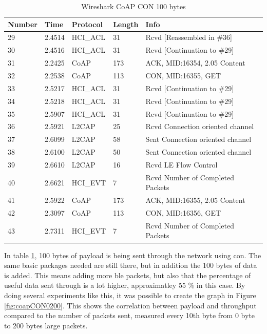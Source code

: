 \begin{table}[H]
\centering
\caption{Wireshark CoAP CON 100 bytes}
\label{coapCON100table}
\begin{tabular}{lllll}
Number & Time   & Protocol & Length & Info                             \\ \hline
29     & 2.4514 & HCI\_ACL & 31     & Rcvd {[}Reassembled in \#36{]}   \\
30     & 2.4516 & HCI\_ACL & 31     & Rcvd {[}Continuation to \#29{]}  \\
31     & 2.2425 & CoAP     & 173    & ACK, MID:16354, 2.05 Content     \\
32     & 2.2538 & CoAP     & 113    & CON, MID:16355, GET              \\
33     & 2.5217 & HCI\_ACL & 31     & Rcvd {[}Continuation to \#29{]}  \\
34     & 2.5218 & HCI\_ACL & 31     & Rcvd {[}Continuation to \#29{]}  \\
35     & 2.5907 & HCI\_ACL & 31     & Rcvd {[}Continuation to \#29{]}  \\
36     & 2.5921 & L2CAP    & 25     & Rcvd Connection oriented channel \\
37     & 2.6099 & L2CAP    & 58     & Sent Connection oriented channel \\
38     & 2.6100 & L2CAP    & 50     & Sent Connection oriented channel \\
39     & 2.6610 & L2CAP    & 16     & Rcvd LE Flow Control             \\
40     & 2.6621 & HCI\_EVT & 7      & Rcvd Number of Completed Packets \\
41     & 2.5922 & CoAP     & 173    & ACK, MID:16355, 2.05 Content     \\
42     & 2.3097 & CoAP     & 113    & CON, MID:16356, GET              \\ 
43     & 2.7311 & HCI\_EVT & 7      & Rcvd Number of Completed Packets \\ \hline
\end{tabular}
\end{table}

\noindent In table \ref{coapCON100table}, 100 bytes of \gls{payload} is being sent through the network using \gls{con}. The same basic packages needed are still there, but in addition the 100 bytes of data is added. This means adding more \gls{ble} packets, but also that the percentage of useful data sent through is a lot higher, approximatley 55 \% in this case. By doing several experiments like this, it was possible to create the graph in Figure \ref{fig:coapCON0200}. This shows the correlation between \gls{payload} and \gls{throughput} compared to the number of packets sent, measured every 10th byte from 0 byte to 200 bytes large packets. %


